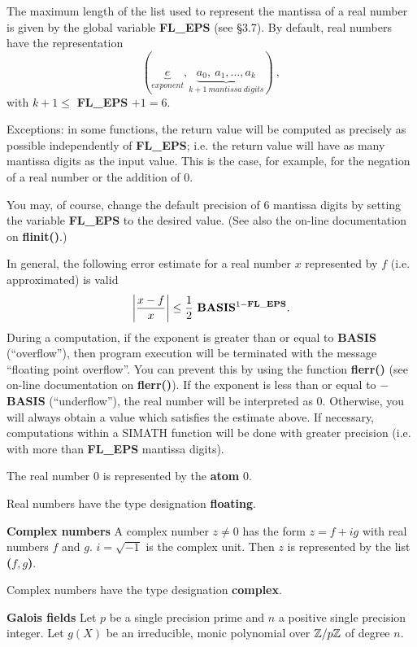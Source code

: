 \newpage

The maximum length of the list used to represent the mantissa of a real number is given
by the global variable {\bf FL\_EPS} (see \S 3.7). By default, real numbers have the representation
$$
          (\underbrace{e}_{exponent}, \underbrace{a_0,\ a_1, \ldots, a_k}_{k+1\ mantissa\ digits})\ , 
$$
with $k + 1 \leq$ {\bf FL\_EPS} $ + 1 = 6$.

Exceptions: in some functions, the return value will be computed as precisely as possible
independently of {\bf FL\_EPS}; i.e. the return value will have as many mantissa digits as
the input value. This is the case, for example, for the negation of a real number or the
addition of $0$.

You may, of course, change the default precision of 6 mantissa digits by setting the variable
{\bf FL\_EPS} to the desired value. (See also the on-line documentation on {\bf flinit()}.)

In general, the following error estimate for a real number $x$ represented by $f$ (i.e.
approximated) is valid
$$
       \left|\frac{x-f}{x} \right| \leq \frac{1}{2}\ \mbox{\bf BASIS}{\/}^{1-{\rm \bf FL\_EPS}}. 
$$
During a computation, if the exponent is greater than or equal to {\bf BASIS} (``overflow''),
then program execution will be terminated with the message ``floating point overflow''. You can
prevent this by using the function {\bf flerr()} (see on-line documentation on {\bf flerr()}).
If the exponent is less than or equal to $-${\bf BASIS} (``underflow''), the real number will be
interpreted as $0$. Otherwise, you will always obtain a value which satisfies the estimate above.
If necessary, computations within a SIMATH function will be done with greater precision
(i.e. with more than {\bf FL\_EPS} mantissa digits).

The real number $0$ is represented by the {\bf atom} $0$.

Real numbers have the type designation {\bf floating}.

\leer
{\bf Complex numbers}
\leer 
A complex number $z \not= 0$ has the form $z=f+ig$ 
with real numbers $f$ and $g$. $i=\sqrt{-1}$ is the complex unit.
Then {\bf $z$} is represented by the list {\bf ($ f, g$)}.

Complex numbers have the type designation {\bf complex}.

\leer
{\bf Galois fields}
\leer 
Let {\bf $p$} be a single precision prime and {\bf $n$} a positive 
single precision integer. Let {\bf $g(X)$} be an irreducible,
monic polynomial over $\mbox{$\mathbb Z$}/p\mbox{$\mathbb Z$}$ of degree $n$.


